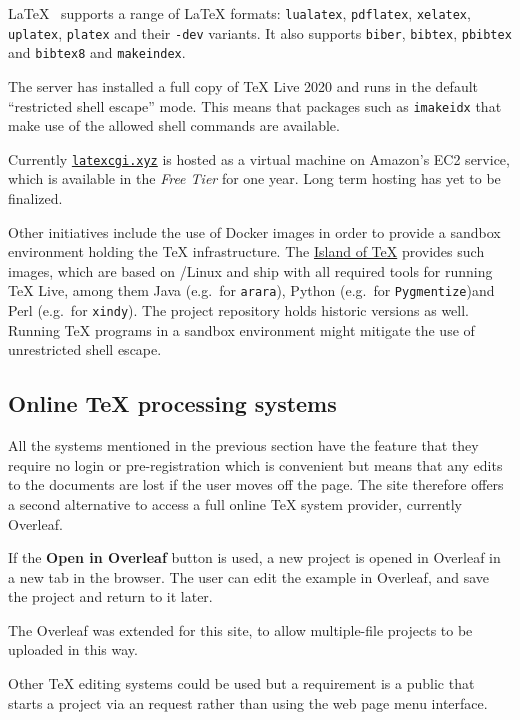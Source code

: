 \documentclass[harvardcite]{ltugboat}
\begin{document}
\LaTeX{}~ supports a range of \LaTeX{} formats:
\texttt{lualatex}, \texttt{pdflatex}, \texttt{xelatex},
\texttt{uplatex}, \texttt{platex} and their \texttt{-dev} variants. It also
supports \texttt{biber}, \texttt{bibtex}, \texttt{pbibtex} and \texttt{bibtex8} and \texttt{makeindex}.

The server has installed a full copy of \TeX{} Live 2020 and runs in
the default \enquote{restricted shell escape} mode. This means that packages
 such as \texttt{imakeidx} that make use of the allowed shell commands
are available.

Currently \href{https://latexcgi.xyz}{\nolinkurl{latexcgi.xyz}} is hosted as a virtual machine on
Amazon's EC2 service, which is available in the \emph{Free Tier} for one
year. Long term hosting has yet to be finalized.

Other initiatives include the use of Docker images in order to provide
a sandbox environment holding the \TeX{} infrastructure. The
\href{https://gitlab.com/islandoftex/images}{Island of \TeX{}} provides
such images, which are based on /Linux and ship with all required
tools for running \TeX{} Live, among them Java (e.g.\ for \texttt{arara}),
Python (e.g.\ for \texttt{Pygmentize})and Perl (e.g.\ for \texttt{xindy}).
The project repository holds historic versions as well. Running \TeX{} programs
in a sandbox environment might mitigate the use of unrestricted shell escape.

\subsection{Online \TeX{} processing systems}

All the systems mentioned in the previous section have the feature that
they require no login or pre-registration which is convenient but
means that any edits to the documents are lost if the user moves off
the page.  The site therefore offers a second alternative to access a
full online \TeX{} system provider, currently Overleaf.

If the \textbf{Open in Overleaf} button is used, a new project is
opened in Overleaf in a new tab in the browser. The user can edit the
example in Overleaf, and save the project and return to it later.

The Overleaf  was extended for this site, to allow multiple-file
projects to be uploaded in this way.

Other \TeX{} editing systems could be used but a requirement is a
public  that starts a project via an  request rather than using
the web page menu interface.
\end{document}
